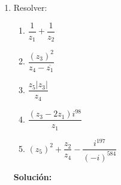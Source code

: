 \documentclass[12pt]{article}
\newcommand{\solucion}{%
    \vspace{0.8em}%
    \textbf{Solución:}%
}
\begin{document}
\begin{enumerate}[label=\alph*.-]
\begin{enumerate}[label=\roman*)]
        \item \textbf{El conjugado de $z_1$:}
        \[
        \overline{z_1} = \overline{1-i} = 1 + i
        \]

        \item \textbf{El conjugado del opuesto de $z_4$:}
        \begin{align*}
        -z_4 &= -(-1+3i) = 1 - 3i \\[0.3em]
        \overline{-z_4} &= \overline{1-3i} = 1 + 3i
        \end{align*}

        \item \textbf{El doble de la parte imaginaria del conjugado de $z_2$:}
        \begin{align*}
        \overline{z_2} &= \overline{3} = 3 \\[0.3em]
        \text{Im}(\overline{z_2}) &= 0 \\[0.3em]
        2 \cdot \text{Im}(\overline{z_2}) &= 2 \cdot 0 = 0
        \end{align*}

        \item \textbf{El módulo del conjugado de $z_3$:}
        \begin{align*}
        \overline{z_3} &= \overline{\sqrt{3}-i} = \sqrt{3} + i \\[0.3em]
        |\overline{z_3}| &= \sqrt{(\sqrt{3})^2 + 1^2} = \sqrt{3+1} = \sqrt{4} = 2
        \end{align*}
    \end{enumerate}

    \item Resolver:
    \begin{enumerate}[label=\roman*)]
        \item $\dfrac{1}{z_1} + \dfrac{1}{z_2}$
        \item $\dfrac{(z_3)^2}{z_4 - \overline{z_1}}$
        \item $\dfrac{z_5 |z_3|}{z_4}$
        \item $\dfrac{(z_3 - 2z_1)i^{98}}{z_1}$
        \item $(z_5)^2 + \dfrac{z_2}{z_4} - \dfrac{i^{197}}{(-i)^{584}}$
    \end{enumerate}

    \solucion


\end{enumerate}
\end{document}
